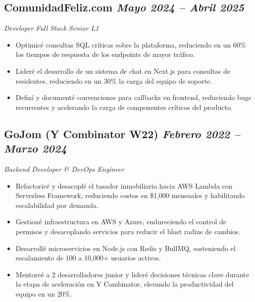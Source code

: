\documentclass[10pt]{article}
\begin{document}
\vspace{2em}
\subsection*{ComunidadFeliz.com \hfill \textnormal{\textit{Mayo 2024 -- Abril 2025}}}
\textit{Developer Full Stack Senior L1}
\begin{itemize}
  \item Optimicé consultas SQL críticas sobre la plataforma, reduciendo en un 60\% los tiempos de respuesta de los endpoints de mayor tráfico.
  \item Lideré el desarrollo de un sistema de chat en Next.js para consultas de residentes, reduciendo en un 30\% la carga del equipo de soporte.
  \item Definí y documenté convenciones para callbacks en frontend, reduciendo bugs recurrentes y acelerando la carga de componentes críticos del producto.
\end{itemize}

\vspace{2em}
\subsection*{GoJom (Y Combinator W22) \hfill \textnormal{\textit{Febrero 2022 -- Marzo 2024}}}
\textit{Backend Developer \& DevOps Engineer}
\begin{itemize}
  \item Refactoricé y desacoplé el tasador inmobiliario hacia AWS Lambda con Serverless Framework, reduciendo costos en \$1,000 mensuales y habilitando escalabilidad por demanda.
  \item Gestioné infraestructura en AWS y Azure, endureciendo el control de permisos y desacoplando servicios para reducir el blast radius de cambios.
  \item Desarrollé microservicios en Node.js con Redis y BullMQ, sosteniendo el escalamiento de 100 a 10,000+ usuarios activos.
  \item Mentoreé a 2 desarrolladores junior y lideré decisiones técnicas clave durante la etapa de aceleración en Y Combinator, elevando la productividad del equipo en un 20\%.
\end{itemize}

\vspace{2em}
\end{document}
